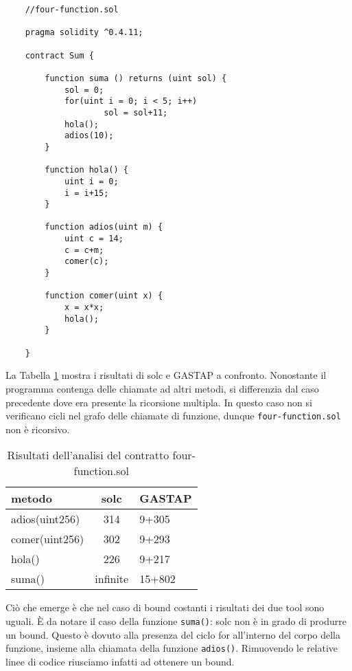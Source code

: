     \begin{minipage}{\linewidth}
    \begin{lstlisting}
    //four-function.sol

    pragma solidity ^0.4.11;

    contract Sum {

        function suma () returns (uint sol) {
            sol = 0;
            for(uint i = 0; i < 5; i++)
                    sol = sol+11;
            hola();
            adios(10);
        }

        function hola() {
            uint i = 0;
            i = i+15;
        }

        function adios(uint m) {
            uint c = 14;
            c = c+m;
            comer(c);   
        }

        function comer(uint x) {
            x = x*x;
            hola();
        }

    }
    \end{lstlisting}
    \end{minipage}
    
    La Tabella \ref{tab:four-function-outputs} mostra i risultati di solc e GASTAP a confronto. Nonostante il programma contenga delle chiamate ad altri metodi, si differenzia dal caso precedente dove era presente la ricorsione multipla. In questo caso non si verificano cicli nel grafo delle chiamate di funzione, dunque \verb|four-function.sol| non è ricorsivo.
    
    \begin{table}[h]
    \begin{center}
    \begin{tabular}{p{5cm}cp{6cm}}  
    \hline \hline
    \bf metodo & \bf solc & \bf GASTAP \\
    \hline
    adios(uint256) & 314 & 9+305\\
    comer(uint256) & 302 & 9+293\\
    hola() & 226 & 9+217\\
    suma() & infinite & 15+802\\
    \hline \hline
    \end{tabular}
    \caption[Analisi di four-function.sol]{Risultati dell'analisi del contratto four-function.sol}\label{tab:four-function-outputs}
    \end{center}
    \end{table}
    
    Ciò che emerge è che nel caso di bound costanti i risultati dei due tool sono uguali. \`E da notare il caso della funzione \verb|suma()|: solc non è in grado di produrre un bound. Questo è dovuto alla presenza del ciclo for all'interno del corpo della funzione, insieme alla chiamata della funzione \verb|adios()|. Rimuovendo le relative linee di codice riusciamo infatti ad ottenere un bound.\newline
    

